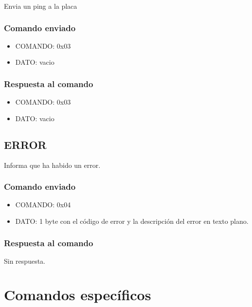 \documentclass[a4paper,11pt]{article}
\begin{document}
Envia un ping a la placa

\subsubsection*{Comando enviado}
\label{ping_comando_enviado}

\begin{itemize}
	\item{COMANDO:} 0x03
	\item{DATO:} vacio
\end{itemize}

\subsubsection*{Respuesta al comando}
\label{ping_respuesta}

\begin{itemize}
	\item{COMANDO:} 0x03
	\item{DATO:} vacio
\end{itemize}

\subsection{ERROR}
\label{error}

Informa que ha habido un error.

\subsubsection*{Comando enviado}
\label{error_comando_enviado}

\begin{itemize}
	\item{COMANDO:} 0x04
	\item{DATO:} 1 byte con el c\'odigo de error y la descripci\'on del error en texto plano.
\end{itemize}

\subsubsection*{Respuesta al comando}
\label{error_respuesta}

Sin respuesta.

\section{Comandos espec\'ificos}
\label{comandos_especificos}
\end{document}
